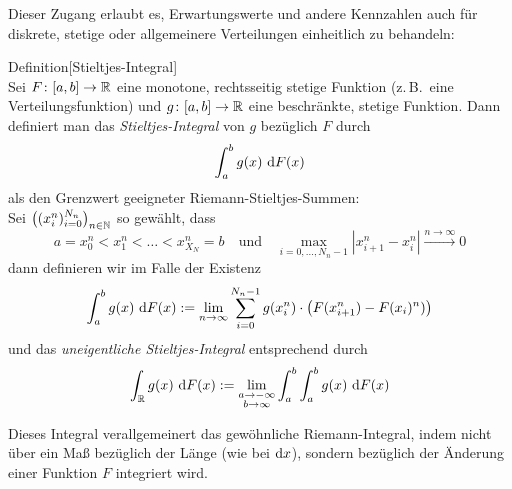 Dieser Zugang erlaubt es, Erwartungswerte und andere Kennzahlen auch für diskrete, 
stetige oder allgemeinere Verteilungen einheitlich zu behandeln:
\begin{colbox}{Definition}[Stieltjes-Integral]\ \\
    Sei $F \colon [a,b] \to \mathbb R$ eine monotone, rechtsseitig stetige Funktion 
    (z.\,B.\ eine Verteilungsfunktion) und $g \colon [a,b] \to \mathbb R$ eine beschränkte, stetige Funktion. 
    Dann definiert man das \emph{Stieltjes-Integral} von $g$ bezüglich $F$ durch
    \[
    \int_a^b g(x) \, \mathop{}\!\mathrm{d} F(x)
    \]
    als den Grenzwert geeigneter Riemann-Stieltjes-Summen: \\
    Sei $\big((x_i^n)_{i=0}^{N_n}\big)_{n\in\mathbb N}$ so gewählt, dass 
    \[
    a = x_0^n < x_1^n < \dots < x_{X_N}^n = b 
    \quad\text{und}\quad
    \max_{i=0,\dots,N_n-1} |x_{i+1}^n - x_{i}^n|\xrightarrow{n\to\infty}0
    \]
    dann definieren wir im Falle der Existenz
    \[
    \int_a^b g(x) \, \mathop{}\!\mathrm{d} F(x) := \lim_{n\to\infty}\sum_{i=0}^{N_n-1}g(x_i^n)\cdot\big(F(x_{i+1}^n)-F(x_i)^n)\big)
    \]
    und das \emph{uneigentliche Stieltjes-Integral} entsprechend durch
    \[
    \int_\mathbb R g(x)\, \mathop{}\!\mathrm{d} F(x) := \lim_{\substack{a\to-\infty \\ b\to\infty}}\int_{a}^{b} \int_a^b g(x) \, \mathop{}\!\mathrm{d} F(x)
    \]
    
    Dieses Integral verallgemeinert das gewöhnliche Riemann-Integral, indem nicht über ein Maß 
    bezüglich der Länge (wie bei $\mathop{}\!\mathrm{d} x$), sondern bezüglich der Änderung einer Funktion $F$ integriert wird.
\end{colbox}

